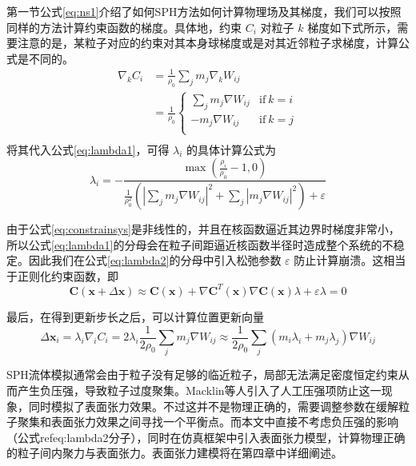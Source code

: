     第一节公式\ref{eq:ns1}介绍了如何SPH方法如何计算物理场及其梯度，我们可以按照同样的方法计算约束函数的梯度。具体地，约束 $C_i$ 对粒子 $k$ 梯度如下式所示，需要注意的是，某粒子对应的约束对其本身球梯度或是对其近邻粒子求梯度，计算公式是不同的。
    \begin{equation}
    	\begin{aligned}
    	\nabla_k C_i &= \frac {1} {\rho_0} \sum_j m_j \nabla_k W_{ij} \\
    	&=
    	\frac {1} {\rho_0}
    	\left\{
    	\begin{array}{ll}
    	\sum_j m_j \nabla W_{ij} & \mathrm{if} \ k = i \\
    	-m_j \nabla W_{ij} & \mathrm{if} \ k = j \\
    	\end{array}
    	\right.
    	\\
    	\end{aligned}
    \end{equation}
    将其代入公式\ref{eq:lambda1}，可得 $\lambda_i$ 的具体计算公式为
    \begin{equation}\label{eq:lambda2}
    	\lambda_i = - \frac 
    	{ \max(\frac{\rho_i} {\rho_0} - 1, 0) } 
    	{ \frac {1}{\rho_0^2} (|\sum_j m_j \nabla W_{ij}|^2 + \sum_j |m_j \nabla W_{ij}|^2 ) + \varepsilon }
    \end{equation}
    
    由于公式\ref{eq:constrainsys}是非线性的，并且在核函数逼近其边界时梯度非常小，所以公式\ref{eq:lambda1}的分母会在粒子间距逼近核函数半径时造成整个系统的不稳定。因此我们在公式\ref{eq:lambda2}的分母中引入松弛参数 $\varepsilon$ 防止计算崩溃。这相当于正则化约束函数，即
    \begin{equation}
    	\mathbf C(\mathbf x + \Delta \mathbf x) 
    	\approx \mathbf C (\mathbf x) + \nabla \mathbf C^T(\mathbf x) \nabla \mathbf C(\mathbf x) \lambda + \varepsilon \lambda = 0
    \end{equation}

    最后，在得到更新步长之后，可以计算位置更新向量
    \begin{equation}
    	\Delta \mathbf x_i = \lambda_i \nabla_iC_i = 2\lambda_i \frac{1}{2\rho_0} \sum_j m_j \nabla W_{ij} \approx
    	\frac{1}{2\rho_0} \sum_j (m_i \lambda_i + m_j \lambda_j) \nabla W_{ij}
    \end{equation}
    
    SPH流体模拟通常会由于粒子没有足够的临近粒子，局部无法满足密度恒定约束从而产生负压强，导致粒子过度聚集。Macklin等人引入了人工压强项\cite{M00SPH}防止这一现象，同时模拟了表面张力效果。不过这并不是物理正确的，需要调整参数在缓解粒子聚集和表面张力效果之间寻找一个平衡点。而本文中直接不考虑负压强的影响（公式ref{eq:lambda2}分子），同时在仿真框架中引入表面张力模型，计算物理正确的粒子间内聚力与表面张力。表面张力建模将在第四章中详细阐述。

